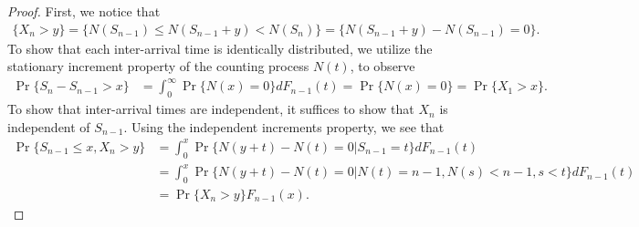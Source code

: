 \documentclass[a4paper,10pt,english]{article}
\begin{document}
\begin{proof} 
First, we notice that 
\begin{align*}
\{X_{n} > y\} = \{ N(S_{n-1}) \leqslant N(S_{n-1} + y) < N(S_{n})\} = \{N(S_{n-1}+y)-N(S_{n-1}) = 0\}. 
\end{align*}
To show that each inter-arrival time is identically distributed, we utilize the stationary increment property of the counting process $N(t)$, to observe 
\begin{align*}
\Pr\{S_n - S_{n-1} > x\} &%
= \int_{0}^{\infty}\Pr\{N(x) = 0\}dF_{n-1}(t) = \Pr\{N(x) = 0\} = \Pr\{X_1 > x\}.
\end{align*}
To show that inter-arrival times are independent, it suffices to show that $X_{n}$ is independent of $S_{n-1}$. 
Using the independent increments property, we see that 
\begin{align*}
\Pr\{S_{n-1} \leqslant x, X_{n} > y\} &%
= \int_{0}^{x}\Pr\{N(y+t) - N(t) = 0|S_{n-1} = t\}dF_{n-1}(t)\\
&= \int_{0}^{x}\Pr\{N(y+t) - N(t) = 0|N(t) = n-1, N(s) < n-1, s < t \}dF_{n-1}(t) \\
&= \Pr\{X_n > y\}F_{n-1}(x).
\end{align*}

\end{proof}
\end{document}
